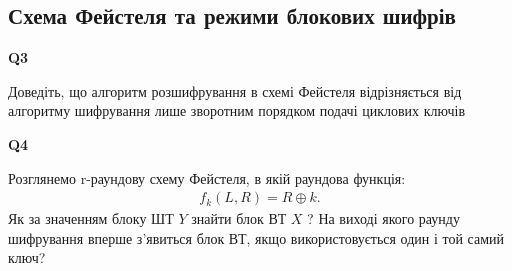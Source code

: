 \documentclass{../../test-template}
\begin{document}
\subsection{Схема Фейстеля та режими блокових шифрів}
\begin{tcolorbox}[lowerbox=invisible,colback=white]
    \begin{minipage}{0.1\textwidth}
        \raggedright
        \vspace*{\fill}
            \textbf{Q3}
        \vspace*{\fill}
        \end{minipage}
        \begin{minipage}{0.75\textwidth}
        Доведіть, що алгоритм розшифрування в схемі Фейстеля відрізняється від алгоритму шифрування лише зворотним порядком подачі циклових ключів
        \end{minipage}
\end{tcolorbox}
\begin{tcolorbox}[lowerbox=invisible,colback=white]
    \begin{minipage}{0.1\textwidth}
        \raggedright
        \vspace*{\fill}
            \textbf{Q4}
        \vspace*{\fill}
        \end{minipage}
        \begin{minipage}{0.75\textwidth}
        Розглянемо r-раундову схему Фейстеля, в якій раундова функція:
        \begin{align*}
           f_k(L,R)=R\oplus k.
        \end{align*} 
        Як за значенням блоку ШТ $Y$ знайти блок ВТ $X$ ? На виході якого раунду шифрування вперше з’явиться блок ВТ, якщо використовується один і той самий ключ?
        \end{minipage}
\end{tcolorbox}
\end{document}
